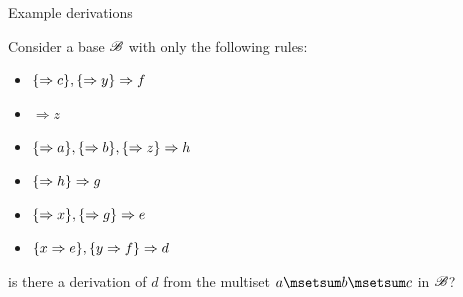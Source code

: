 \documentclass{beamer}
\begin{document}
\begin{frame}{Example derivations}
	\begin{example}
		Consider a base $\mathscr{B}$ with only the following rules:
		\begin{itemize}
			\item $\{\Rightarrow c\},\{\Rightarrow y\}\Rightarrow f$
			\item $\Rightarrow z$
			\item $\{ \Rightarrow a\},\{ \Rightarrow b\},\{\Rightarrow z\}\Rightarrow h$
			\item $\{\Rightarrow h\}\Rightarrow g$			\item $\{\Rightarrow x\},\{\Rightarrow g\}\Rightarrow e$
			\item $\{ x\Rightarrow e\},\{ y\Rightarrow f\}\Rightarrow d$
		\end{itemize}
		is there a derivation of $d$ from the multiset $a\msetsum b\msetsum c$ in $\mathscr{B}$?
	\end{example}
\end{frame}
\end{document}
